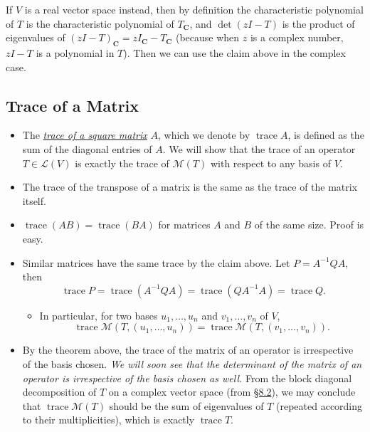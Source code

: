 \documentclass[11pt]{article}
\newcommand{\lk}[2]{\hyperlink{subsection.#1.#2}{\S#1.#2}}
\newcommand{\df}[1]{\ul{\textit{\textsf{#1}}}}
\newcommand{\C}{\mathbf{C}}
\newcommand{\tr}{\operatorname{trace}}
\newcommand{\LV}{\mathcal{L}(V)}
\newcommand{\M}{\mathcal{M}}
\begin{document}
\begin{itemize}
    If $V$ is a real vector space instead, then by definition  the characteristic polynomial of $T$ is the characteristic polynomial of $T_\C$, and $\det(zI - T)$ is the product of eigenvalues of $(zI - T)_\C = zI_\C - T_\C$ (because when $z$ is a complex number, $zI - T$ is a polynomial in $T$). Then we can use the claim above in the complex case.
\end{itemize}

\subsection{Trace of a Matrix}
\begin{itemize}
    \item The \df{trace of a square matrix} $A$, which we denote by $\tr A$, is defined as the sum of the diagonal entries of $A$. We will show that the trace of an operator $T \in \LV$ is exactly the trace of $\M(T)$ with respect to any basis of $V$.
    \item The trace of the transpose of a matrix is the same as the trace of the matrix itself.
    \item $\tr(AB) = \tr(BA)$ for matrices $A$ and $B$ of the same size. Proof is easy.
    \item Similar matrices have the same trace by the claim above. Let $P = A^{-1}QA$, then \[\tr P = \tr(A^{-1}QA) = \tr(QA^{-1}A) = \tr Q.\]
    \begin{itemize}
        \item In particular, for two bases $u_1,\dots,u_n$ and $v_1,\dots,v_n$ of $V$, \[\tr \M(T,(u_1,\dots,u_n)) = \tr \M(T,(v_1,\dots,v_n)).\]
    \end{itemize}
    \item By the theorem above, the trace of the matrix of an operator is irrespective of the basis chosen. \emph{We will soon see that the determinant of the matrix of an operator is irrespective of the basis chosen as well.} From the block diagonal decomposition of $T$ on a complex vector space (from \lk{8}{2}), we may conclude that $\tr \M(T)$ should be the sum of eigenvalues of $T$ (repeated according to their multiplicities), which is exactly $\tr T$.
    

\end{itemize}
\end{document}
